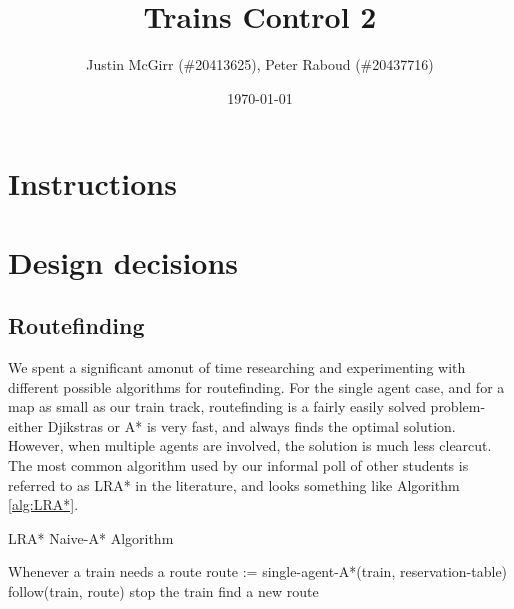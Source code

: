 \documentclass{article}
\title{Trains Control 2}
\author{Justin McGirr (\#20413625), Peter Raboud (\#20437716)}
\date{\today}
\begin{document}
\maketitle

\section{Instructions}


\section{Design decisions}

\subsection{Routefinding}
We spent a significant amonut of time researching and experimenting with
different possible algorithms for routefinding. For the single agent case,
and for a map as small as our train track, routefinding is a fairly easily
solved problem- either Djikstras or A* is very fast, and always finds the
optimal solution. However, when multiple agents are involved, the solution
is much less clearcut. The most common algorithm used by our informal poll
of other students is referred to as LRA* in the literature, and looks
something like Algorithm \ref{alg:LRA*}.
\begin{algorithm}
\label{alg:LRA*}
\caption{LRA* Naive-A* Algorithm}
\begin{algorithmic}
\Loop
\State Whenever a train needs a route
\State route := single-agent-A*(train, reservation-table)
\State follow(train, route)
\EndLoop
{}
		\State stop the train
		\State find a new route
	\EndIf
	\State [...]
\EndFunction
\end{algorithmic}
\end{algorithm}
\end{document}
